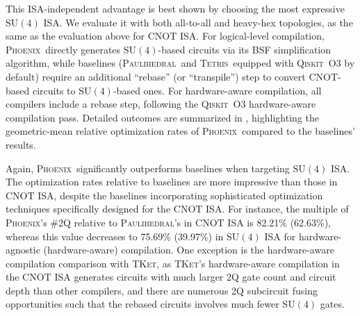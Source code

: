 \documentclass[conference,9pt]{IEEEtran}
\newcommand{\dquote}[1]{``#1''}
\newcommand{\phoenix}{\textsc{Phoenix}}
\newcommand{\qiskit}{\textsc{Qiskit}}
\newcommand{\tket}{\textsc{TKet}}
\newcommand{\tetris}{\textsc{Tetris}}
\newcommand{\paulihedral}{\textsc{Paulihedral}}
\newcommand{\CNOT}{\mathrm{CNOT}}
\newcommand{\SUfour}{\mathrm{SU}(4)}
\begin{document}
    This ISA-independent advantage is best shown by choosing the most expressive $\SUfour$ ISA. We evaluate it with both all-to-all and heavy-hex topologies, as the same as the evaluation above for $\CNOT$ ISA. For logical-level compilation, \phoenix\ directly generates $ \SUfour $-based circuits via its BSF simplification algorithm, while baselines (\paulihedral\ and \tetris\ equipped with \qiskit\ O3 by default) require an additional \dquote{rebase} (or \dquote{transpile}) step to convert $ \CNOT $-based circuits to $ \SUfour $-based ones. For hardware-aware compilation, all compilers include a rebase step, following the \qiskit\ O3 hardware-aware compilation pass. Detailed outcomes are summarized in , highlighting the geometric-mean relative optimization rates of \phoenix\ compared to the baselines' results.

    Again, \phoenix\ significantly outperforms baselines when targeting $ \SUfour $ ISA. The optimization rates relative to baselines are more impressive than those in $ \CNOT $ ISA, despite the baselines incorporating sophisticated optimization techniques specifically designed for the $ \CNOT $ ISA. For instance, the multiple of \phoenix's \#2Q relative to \paulihedral's in $ \CNOT $ ISA is 82.21\% (62.63\%), whereas this value decreases to 75.69\% (39.97\%) in $ \SUfour $ ISA for hardware-agnostic (hardware-aware) compilation. One exception is the hardware-aware compilation comparison with \tket, as \tket's hardware-aware compilation in the $ \CNOT $ ISA generates circuits with much larger 2Q gate count and circuit depth than other compilers, and there are numerous 2Q subcircuit fusing opportunities such that the rebased circuits involves much fewer $ \SUfour $ gates.
\end{document}
